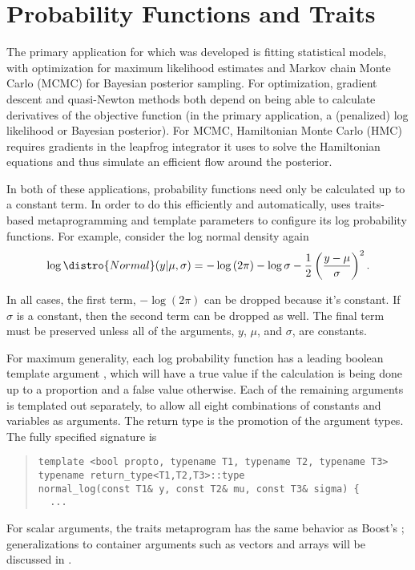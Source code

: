 \documentclass[10pt]{article}
\begin{document}
\section{Probability Functions and Traits}\label{probability-functions.section}\label{traits.section}

The primary application for which  was developed is
fitting statistical models, with optimization for maximum likelihood
estimates and Markov chain Monte Carlo (MCMC) for Bayesian posterior
sampling.  For optimization, gradient descent and quasi-Newton methods
both depend on being able to calculate derivatives of the objective
function (in the primary application, a (penalized) log likelihood or
Bayesian posterior).  For MCMC, Hamiltonian Monte Carlo (HMC) requires
gradients in the leapfrog integrator it uses to solve the Hamiltonian
equations and thus simulate an efficient flow around the posterior.

In both of these applications, probability functions need only be
calculated up to a constant term.  In order to do this efficiently and
automatically,  uses traits-based metaprogramming
and template parameters to configure its log probability functions.
For example, consider the log normal density again
\[
\log \distro{Normal}(y | \mu, \sigma)
= -\log \left( 2 \pi \right)
  - \log \sigma
  - \frac{1}{2} \left( \frac{y - \mu}{\sigma} \right)^2.
\]
%

In all cases, the first term, $-\log \left( 2 \pi \right)$ can be
dropped because it's constant.  If $\sigma$ is a constant, then the
second term can be dropped as well.  The final term must be preserved
unless all of the arguments, $y$, $\mu$, and $\sigma$, are constants.  

For maximum generality, each log probability function has a leading
boolean template argument , which will have a true value
if the calculation is being done up to a proportion and a false value
otherwise.  Each of the remaining arguments is templated out
separately, to allow all eight combinations of constants and variables
as arguments.  The return type is the promotion of the argument
types.  The fully specified signature is
%
\begin{quote}
\begin{Verbatim}
template <bool propto, typename T1, typename T2, typename T3>
typename return_type<T1,T2,T3>::type
normal_log(const T1& y, const T2& mu, const T3& sigma) {
  ...
\end{Verbatim}
\end{quote}
%
For scalar arguments, the  traits metaprogram has
the same behavior as Boost's ; generalizations to
container arguments such as vectors and arrays will be discussed in
.
\end{document}
